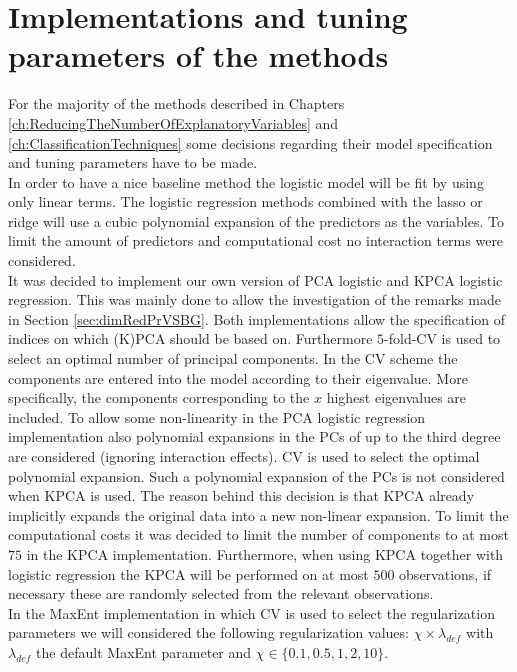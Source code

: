 \section{Implementations and tuning parameters of the methods}
\label{sec:implementation}
For the majority of the methods described in Chapters \ref{ch:ReducingTheNumberOfExplanatoryVariables} and \ref{ch:ClassificationTechniques} some decisions regarding their model specification and tuning parameters have to be made. \\

In order to have a nice baseline method the logistic model will be fit by using only linear terms. The logistic regression methods combined with the lasso or ridge will use a cubic polynomial expansion of the predictors as the variables. To limit the amount of predictors and computational cost no interaction terms were considered. \\

It was decided to implement our own version of PCA logistic and KPCA logistic regression. This was mainly done to allow the investigation of the remarks made in Section \ref{sec:dimRedPrVSBG}. Both implementations allow the specification of indices on which (K)PCA should be based on. Furthermore $5$-fold-CV is used to select an optimal number of principal components. In the CV scheme the components are entered into the model according to their eigenvalue. More specifically, the components corresponding to the $x$ highest eigenvalues are included. To allow some non-linearity in the PCA logistic regression implementation also polynomial expansions in the PCs of up to the third degree are considered (ignoring interaction effects). CV is used to select the optimal polynomial expansion. Such a polynomial expansion of the PCs is not considered when KPCA is used. The reason behind this decision is that KPCA already implicitly expands the original data into a new non-linear expansion. To limit the computational costs it was decided to limit the number of components to at most $75$ in the KPCA implementation. Furthermore, when using KPCA together with logistic regression the KPCA will be performed on at most $500$ observations, if necessary these are randomly selected from the relevant observations. \\

In the MaxEnt implementation in which CV is used to select the regularization parameters we will considered the following regularization values: $\chi \times \lambda_{def}$ with $\lambda_{def}$ the default MaxEnt parameter and $\chi \in \{0.1,0.5,1,2,10\}$. \\

